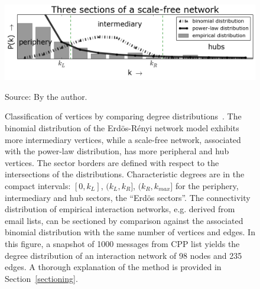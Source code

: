 \documentclass[review]{elsarticle}
\begin{document}
\clearpage
\begin{figure}[!h]
\centering
\includegraphics[width=\textwidth]{figs/fser__}
\caption{Classification of vertices by comparing degree
distributions~\cite{3setores}.
The binomial distribution of the Erd\"os-R\'enyi network model exhibits more intermediary vertices, while a scale-free network, associated with the power-law distribution, has more peripheral and hub vertices. The sector borders are defined with respect to the intersections of the distributions. Characteristic degrees are in the compact intervals: $[0,k_L]$, $(k_L,k_R]$, $(k_R,k_{max}]$ for the periphery, intermediary and hub sectors, the ``Erd\"os sectors''.
The connectivity distribution of empirical interaction networks, e.g. derived from email lists, can be sectioned by comparison against the associated binomial distribution with the same number of vertices and edges. In this figure, a snapshot of 1000 messages from CPP list yields the degree distribution of an interaction network of 98 nodes and 235 edges. A thorough explanation of the method is provided in Section~\ref{sectioning}.}
\label{fig:setores}
\begin{flushleft}\footnotesize
Source: By the author.\
\end{flushleft}
\end{figure}
\end{document}
